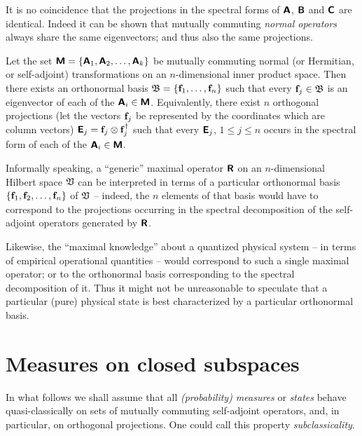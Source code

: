It is no coincidence that the projections in the spectral forms of
$\textsf{\textbf{A}}$,
$\textsf{\textbf{B}}$  and
$\textsf{\textbf{C}}$ are identical.
Indeed it can be shown that mutually commuting {\em normal operators} always share the same eigenvectors; and thus also the same projections.

Let the set $\textsf{\textbf{M}}
=
\{
\textsf{\textbf{A}}_1,
\textsf{\textbf{A}}_2,
\ldots ,
\textsf{\textbf{A}}_k
\}
$
be mutually commuting  normal (or Hermitian, or self-adjoint) transformations on an $n$-dimensional inner product space.
Then there exists an orthonormal basis
${\frak B}= \{
{\bf f}_1,
\ldots ,
{\bf f}_n\}$
such that every ${\bf f}_j \in {\frak B}$  is an eigenvector  of each of the $\textsf{\textbf{A}}_i \in  \textsf{\textbf{M}}$.
Equivalently, there exist $n$ orthogonal projections  (let the vectors ${\bf f}_j$ be represented by the coordinates which are column vectors)
$\textsf{\textbf{E}}_j= {\bf f}_j\otimes {\bf f}_j^\dagger$
such that every $\textsf{\textbf{E}}_j$, $1\le j\le n$ occurs in the spectral form of each of the $\textsf{\textbf{A}}_i \in  \textsf{\textbf{M}}$.


Informally speaking,
a ``generic'' maximal operator $\textsf{\textbf{R}}$ on an $n$-dimensional Hilbert space ${\frak V}$
can be interpreted in terms of a particular orthonormal basis
$\{{\bf f}_1,{\bf f}_2,\ldots ,{\bf f}_n\}$ of ${\frak V}$
-- indeed, the $n$ elements of that basis would have to correspond to the projections occurring
in the spectral decomposition of the self-adjoint operators
generated by $\textsf{\textbf{R}}$.

{\color{Purple}
Likewise, the ``maximal knowledge'' about a quantized physical system -- in terms of empirical operational quantities --
would correspond to such a single maximal operator;
or to the orthonormal basis corresponding to the spectral decomposition of it.
Thus it might not be unreasonable to speculate that a particular (pure) physical state is best characterized by a particular orthonormal basis.
}


\section{Measures on closed subspaces}

In what follows we shall assume that all {\em (probability) measures}
or {\em states}
behave quasi-classically on sets of mutually commuting self-adjoint operators,
and, in particular, on orthogonal projections. One could call this property {\em subclassicality}.

